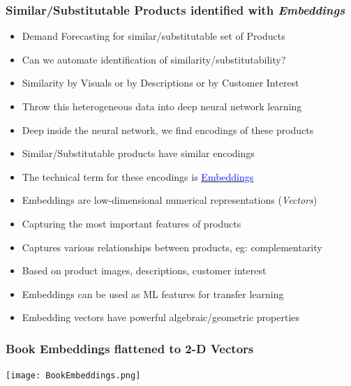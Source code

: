 \documentclass[handout]{beamer}
\begin{document}
\begin{frame}
\frametitle{Similar/Substitutable Products identified with {\em Embeddings}}
\pause
\begin{itemize}[<+->]
\item Demand Forecasting for similar/substitutable set of Products
\item Can we automate identification of similarity/substitutability?
\item Similarity by Visuals or by Descriptions or by Customer Interest
\item Throw this heterogeneous data into deep neural network learning
\item Deep inside the neural network, we find encodings of these products
\item Similar/Substitutable products have similar encodings
\item The technical term for these encodings is \href{https://developers.google.com/machine-learning/crash-course/embeddings/video-lecture}{\underline{\textcolor{blue}{Embeddings}}}
\item Embeddings are low-dimensional numerical representations ({\em Vectors})
\item Capturing the most important features of products
\item Captures various relationships between products, eg: complementarity
\item Based on product images, descriptions, customer interest
\item Embeddings can be used as ML features for transfer learning
\item Embedding vectors have powerful algebraic/geometric properties
\end{itemize}
\end{frame}

\begin{frame}
\frametitle{Book Embeddings flattened to 2-D Vectors}
\texttt{[image: BookEmbeddings.png]}
\end{frame}
\end{document}
